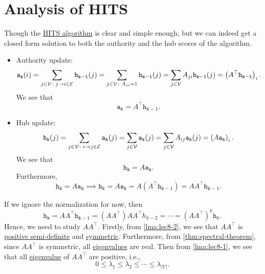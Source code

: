\section{Analysis of HITS}
Though the \hyperref[algo:HITS-algorithm]{HITS algorithm} is clear and simple enough, but we can indeed get a closed form solution to both the authority and the hub scores of the algorithm.
\begin{itemize}
	\item Authority update:
	      \[
		      \mathtt{a_k(\mathnormal{i})}  = \sum\limits_{j\in \mathcal{V}\colon j\to i\in \mathcal{E}}\mathtt{h_{k-1}(\mathnormal{j})}
		      =\sum\limits_{j\in\mathcal{V}\colon A_{ji} = 1}\mathtt{h_{k-1}(\mathnormal{j})}
		      =\sum\limits_{j\in\mathcal{V}}A_{ji}\mathtt{h_{k-1}(\mathnormal{j})}
		      = \left(A^{\top} \mathtt{h_{k-1}}\right)_i.
	      \]
	      We see that
	      \[
		      \mathtt{a_k} = A^{\top}\mathtt{h_{k-1}}.
	      \]
	\item Hub update:
	      \[
		      \mathtt{h_k(\mathnormal{j})} = \sum\limits_{j\in\mathcal{V}\colon i\to j\in\mathcal{E}} \mathtt{a_k(\mathnormal{j})}
		      = \sum\limits_{j\in\mathcal{V}} \mathtt{a_k(\mathnormal{j})}
		      = \sum\limits_{j\in\mathcal{V} }A_{ij}\mathtt{a_k(\mathnormal{j})}
		      = \left(A\mathtt{a_k}\right)_i.
	      \]
	      We see that
	      \[
		      \mathtt{h_{k}} = A \mathtt{a_{k}}.
	      \]
	      Furthermore,
	      \[
		      \mathtt{h_k} = A\mathtt{a_k}\implies \mathtt{h_k}= A\mathtt{a_k} = A(A^{\top}\mathtt{h_{k-1}}) = A A^{\top} \mathtt{h_{k-1}}.
	      \]
\end{itemize}
If we ignore the normalization for now, then
\[
	\mathtt{h_k} = A A^{\top}\mathtt{h_{k-1}} = (A A^{\top})A A^{\top} h_{k-2} = \cdots = (A A^{\top})^k \mathtt{h_0}.
\]
Hence, we need to study \(A A^{\top}\). Firstly, from \autoref{lma:lec8-2}, we see that \(A A^{\top} \) is \hyperref[def:positive-semi-definite]{positive semi-definite} and \hyperref[def:symmetric-matrix]{symmetric}. Furthermore, from \autoref{thm:spectral-theorem}, since \(A A^{\top} \) is symmetric, all \hyperref[def:eigenvalue]{eigenvalues} are real. Then from \autoref{lma:lec8-1}, we see that all \hyperref[def:eigenvalue]{eigenvalue} of \(A A^{\top} \) are positive, i.e.,
\[
	0 \leq \lambda_1 \leq \lambda_2 \leq \cdots \leq \lambda_{\left\vert \mathcal{V} \right\vert } .
\]

